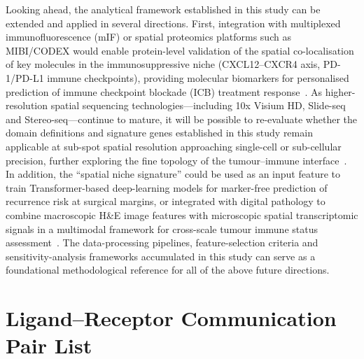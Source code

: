\documentclass[12pt, a4paper]{article}
\begin{document}
Looking ahead, the analytical framework established in this study can be extended and applied in several directions. First, integration with multiplexed immunofluorescence (mIF) or spatial proteomics platforms such as MIBI/CODEX would enable protein-level validation of the spatial co-localisation of key molecules in the immunosuppressive niche (CXCL12--CXCR4 axis, PD-1/PD-L1 immune checkpoints), providing molecular biomarkers for personalised prediction of immune checkpoint blockade (ICB) treatment response~\citep{keren2018structured,zhu2021spark}. As higher-resolution spatial sequencing technologies---including 10x Visium HD, Slide-seq and Stereo-seq---continue to mature, it will be possible to re-evaluate whether the domain definitions and signature genes established in this study remain applicable at sub-spot spatial resolution approaching single-cell or sub-cellular precision, further exploring the fine topology of the tumour--immune interface~\citep{moses2022museum,chen2022spatia}. In addition, the ``spatial niche signature'' could be used as an input feature to train Transformer-based deep-learning models for marker-free prediction of recurrence risk at surgical margins, or integrated with digital pathology to combine macroscopic H\&E image features with microscopic spatial transcriptomic signals in a multimodal framework for cross-scale tumour immune status assessment~\citep{chen2016liver,shmatko2022artific}. The data-processing pipelines, feature-selection criteria and sensitivity-analysis frameworks accumulated in this study can serve as a foundational methodological reference for all of the above future directions.


\newpage
\appendix
\renewcommand{\thesection}{\Alph{section}}

\section{Ligand--Receptor Communication Pair List}
\label{app:lr_table}
\end{document}
